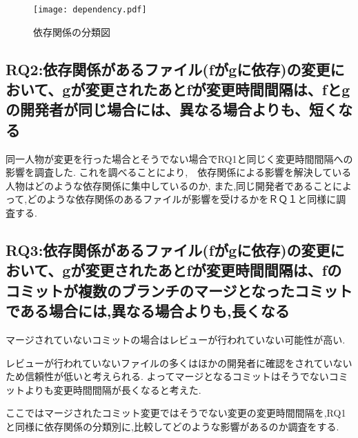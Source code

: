 \documentclass[submit,ses,noauthor]{ipsj} %
\begin{document}
\begin{figure*}[t]
\centering
\texttt{[image: dependency.pdf]}
\caption{依存関係の分類図}
\label{fig:dependency} 
\end{figure*}

\subsection{RQ2:依存関係があるファイル(fがgに依存)の変更において、gが変更されたあとfが変更時間間隔は、fとgの開発者が同じ場合には、異なる場合よりも、短くなる}
同一人物が変更を行った場合とそうでない場合でRQ1と同じく変更時間間隔への影響を調査した.
これを調べることにより,　依存関係による影響を解決している人物はどのような依存関係に集中しているのか,
また,同じ開発者であることによって,どのような依存関係のあるファイルが影響を受けるかをＲＱ１と同様に調査する.

\subsection{RQ3:依存関係があるファイル(fがgに依存)の変更において、gが変更されたあとfが変更時間間隔は、fのコミットが複数のブランチのマージとなったコミットである場合には,異なる場合よりも,長くなる}
マージされていないコミットの場合はレビューが行われていない可能性が高い.

レビューが行われていないファイルの多くはほかの開発者に確認をされていないため信頼性が低いと考えられる.
よってマージとなるコミットはそうでないコミットよりも変更時間間隔が長くなると考えた.

ここではマージされたコミット変更ではそうでない変更の変更時間間隔を,RQ1と同様に依存関係の分類別に,比較してどのような影響があるのか調査をする.

\end{document}
